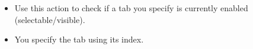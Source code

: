 \begin{itemize}
\item Use this action to check if a tab you specify is currently enabled (selectable/visible).
\item You specify the tab using its index. 
\end{itemize}

 
